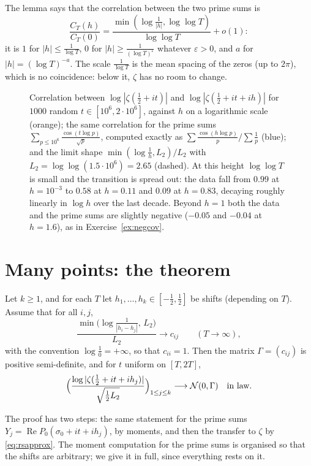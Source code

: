 The lemma says that the correlation between the two prime sums is
\[
\frac{C_T(h)}{C_T(0)}=\frac{\min(\log\frac1{|h|},\log\log T)}{\log\log T}+o(1):
\]
it is $1$ for $|h|\le\frac1{\log T}$, $0$ for $|h|\ge\frac1{(\log T)^{\varepsilon}}$ whatever $\varepsilon>0$, and $a$ for $|h|=(\log T)^{-a}$. The scale $\frac1{\log T}$ is the mean spacing of the zeros (up to $2\pi$), which is no coincidence: below it, $\zeta$ has no room to change.

\begin{figure}[ht]\centering{}
\caption{Correlation between $\log|\zeta(\frac12+it)|$ and $\log|\zeta(\frac12+it+ih)|$ for $1000$ random $t\in[10^6,2\cdot10^6]$, against $h$ on a logarithmic scale (orange); the same correlation for the prime sums $\sum_{p\le10^6}\frac{\cos(t\log p)}{\sqrt p}$, computed exactly as $\sum\frac{\cos(h\log p)}p/\sum\frac1p$ (blue); and the limit shape $\min(\log\frac1h,L_2)/L_2$ with $L_2=\log\log(1.5\cdot10^6)=2.65$ (dashed). At this height $\log\log T$ is small and the transition is spread out: the data fall from $0.99$ at $h=10^{-3}$ to $0.58$ at $h=0.11$ and $0.09$ at $h=0.83$, decaying roughly linearly in $\log h$ over the last decade. Beyond $h=1$ both the data and the prime sums are slightly negative ($-0.05$ and $-0.04$ at $h=1.6$), as in Exercise~\ref{ex:negcov}.}
\label{fig:correlation}
\end{figure}

\section{Many points: the theorem}

\begin{theorem}\label{thm:multipoint}
Let $k\ge1$, and for each $T$ let $h_1,\dots,h_k\in[-\frac12,\frac12]$ be shifts (depending on $T$). Assume that for all $i,j$,
\[
\frac{\min\bigl(\log\frac1{|h_i-h_j|},\,L_2\bigr)}{L_2}\longrightarrow c_{ij}\qquad(T\to\infty),
\]
with the convention $\log\frac10=+\infty$, so that $c_{ii}=1$. Then the matrix $\Gamma=(c_{ij})$ is positive semi-definite, and for $t$ uniform on $[T,2T]$,
\[
\Bigl(\frac{\log|\zeta(\frac12+it+ih_j)|}{\sqrt{\frac12L_2}}\Bigr)_{1\le j\le k}\longrightarrow\mathcal N(0,\Gamma)\quad\text{in law}.
\]
\end{theorem}

The proof has two steps: the same statement for the prime sums $Y_j=\operatorname{Re}P_0(\sigma_0+it+ih_j)$, by moments, and then the transfer to $\zeta$ by \eqref{eq:rsapprox}. The moment computation for the prime sums is organised so that the shifts are arbitrary; we give it in full, since everything rests on it.

